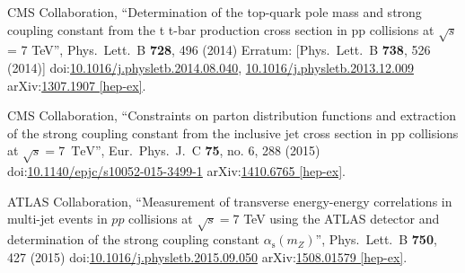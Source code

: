 \begin{thebibliography}{99}
 CMS Collaboration, ``Determination of the top-quark pole mass and strong coupling constant from the t t-bar production cross section in pp collisions at $\sqrt{s}$ = 7 TeV'', Phys.\ Lett.\ B {\bf 728}, 496 (2014) Erratum: [Phys.\ Lett.\ B {\bf 738}, 526 (2014)] doi:\href{http://dx.doi.org/10.1016/j.physletb.2014.08.040}{10.1016/j.physletb.2014.08.040}, \href{http://dx.doi.org/10.1016/j.physletb.2013.12.009}{10.1016/j.physletb.2013.12.009} arXiv:\href{https://arxiv.org/abs/1307.1907}{1307.1907 [hep-ex]}.

CMS Collaboration, ``Constraints on parton distribution functions and extraction of the strong coupling constant from the inclusive jet cross section in pp collisions at $\sqrt{s} = 7$ $\,\text {TeV}$'', Eur.\ Phys.\ J.\ C {\bf 75}, no. 6, 288 (2015) doi:\href{http://dx.doi.org/10.1140/epjc/s10052-015-3499-1}{10.1140/epjc/s10052-015-3499-1} arXiv:\href{https://arxiv.org/abs/1410.6765}{1410.6765 [hep-ex]}.
\begin{comment}
\bibitem{Schmidt:2012az} 
B.~Schmidt and M.~Steinhauser, ``CRunDec: a C++ package for running and decoupling of the strong coupling and quark masses'', Comput.\ Phys.\ Commun.\  {\bf 183}, 1845 (2012) doi:\href{http://dx.doi.org/10.1016/j.cpc.2012.03.023}{10.1016/j.cpc.2012.03.023} arXiv:\href{https://arxiv.org/abs/1201.6149}{1201.6149 [hep-ph]}.

\bibitem{Patrignani:2016xqp} 
C.~Patrignani {\it et al.} (Particle Data Group), ``Review of Particle Physics,'' Chin.\ Phys.\ C {\bf 40}, no. 10, 100001 (2016). doi:\href{http://dx.doi.org/10.1088/1674-1137/40/10/100001}{10.1088/1674-1137/40/10/100001}.

\bibitem{Chetyrkin:2000yt} 
K.~G.~Chetyrkin, J.~H.~Kuhn and M.~Steinhauser, ``RunDec: A Mathematica package for running and decoupling of the strong coupling and quark masses'', Comput.\ Phys.\ Commun.\  {\bf 133}, 43 (2000) doi:\href{http://dx.doi.org/10.1016/S0010-4655(00)00155-7}{10.1016/S0010-4655(00)00155-7} arXiv:\href{https://arxiv.org/abs/hep-ph/0004189}{hep-ph/0004189}.
\end{comment}
ATLAS Collaboration, ``Measurement of transverse energy-energy correlations in multi-jet events in $pp$ collisions at $\sqrt{s} = 7$ TeV using the ATLAS detector and determination of the strong coupling constant $\alpha_{\mathrm{s}}(m_Z)$'', Phys.\ Lett.\ B {\bf 750}, 427 (2015) doi:\href{http://dx.doi.org/10.1016/j.physletb.2015.09.050}{10.1016/j.physletb.2015.09.050} arXiv:\href{https://arxiv.org/abs/1508.01579}{1508.01579 [hep-ex]}.


\end{thebibliography}
